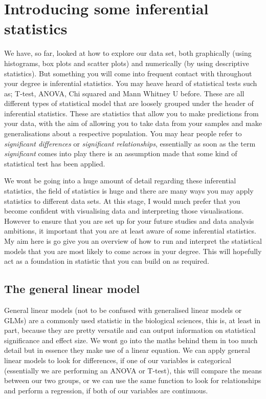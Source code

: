 \documentclass[
]{book}
\begin{document}
\hypertarget{introducing-some-inferential-statistics}{%
\section{Introducing some inferential statistics}\label{introducing-some-inferential-statistics}}

We have, so far, looked at how to explore our data set, both graphically (using histograms, box plots and scatter plots) and numerically (by using descriptive statistics). But something you will come into frequent contact with throughout your degree is inferential statistics. You may heave heard of statistical tests such as; T-test, ANOVA, Chi squared and Mann Whitney U before. These are all different types of statistical model that are loosely grouped under the header of inferential statistics. These are statistics that allow you to make predictions from your data, with the aim of allowing you to take data from your samples and make generalisations about a respective population. You may hear people refer to \emph{significant differences} or \emph{significant relationships}, essentially as soon as the term \emph{significant} comes into play there is an assumption made that some kind of statistical test has been applied.

We wont be going into a huge amount of detail regarding these inferential statistics, the field of statistics is huge and there are many ways you may apply statistics to different data sets. At this stage, I would much prefer that you become confident with visualising data and interpreting those visualisations. However to ensure that you are set up for your future studies and data analysis ambitions, it important that you are at least aware of some inferential statistics. My aim here is go give you an overview of how to run and interpret the statistical models that you are most likely to come across in your degree. This will hopefully act as a foundation in statistic that you can build on as required.

\hypertarget{the-general-linear-model}{%
\subsection{The general linear model}\label{the-general-linear-model}}

General linear models (not to be confused with generalised linear models or GLMs) are a commonly used statistic in the biological sciences, this is, at least in part, because they are pretty versatile and can output information on statistical significance and effect size. We wont go into the maths behind them in too much detail but in essence they make use of a linear equation. We can apply general linear models to look for differences, if one of our variables is categorical (essentially we are performing an ANOVA or T-test), this will compare the means between our two groups, or we can use the same function to look for relationships and perform a regression, if both of our variables are continuous.
\end{document}
